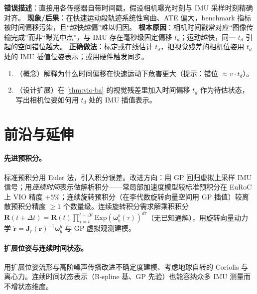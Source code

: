 \begin{pitfall}
\textbf{错误描述}：直接用各传感器自带时间戳，假设相机曝光时刻与 IMU 采样时刻精确对齐。
\textbf{现象/后果}：在快速运动段轨迹系统性弯曲、ATE 偏大，benchmark 指标被时间偏移污染，且“越快越偏”难以归因。
\textbf{根本原因}：相机时间戳常对应“图像传输完成”而非“曝光中点”，与 IMU 存在毫秒级固定偏移 $t_d$；运动越快，同一 $t_d$ 引起的空间错位越大。
\textbf{正确做法}：标定或在线估计 $t_d$，把视觉残差的相机位姿用 $t_d$ 处的 IMU 插值位姿表示；或用硬件触发同步。
\end{pitfall}

\begin{practice}
\begin{enumerate}
  \item （概念）解释为什么时间偏移在快速运动下危害更大（提示：错位 $\approx v\cdot t_d$）。
  \item （设计扩展）在 \cref{thm:vio-ba} 的视觉残差里加入时间偏移 $t_d$ 作为待估状态，写出相机位姿如何用 $t_d$ 处的 IMU 插值表示。
\end{enumerate}
\end{practice}

\section{前沿与延伸}
\label{sec:vio-frontier}

\paragraph{先进预积分。}
标准预积分用 Euler 法，引入积分误差。改进方向：用 GP 回归虚拟上采样 IMU 信号；用\emph{连续时间}表示做解析积分——常局部加速度模型较标准预积分在 EuRoC 上 VIO 精度 $+5\%$；连续旋转预积分（在李代数旋转向量空间用 GP 插值）较离散预积分精度 $\ge1$ 个数量级\cite{carlone2026handbook}。连续旋转积分需求解乘积积分 $\mathbf{R}(t+\Delta t)=\mathbf{R}(t)\prod_{\tau=t}^{t+\Delta t}\mathrm{Exp}(\boldsymbol{\omega}^b_b(\tau))^{d\tau}$（无已知通解），用旋转向量动力学 $\dot{\mathbf{r}}=\mathbf{J}_r(\mathbf{r})^{-1}\boldsymbol{\omega}^b_b$ 与 GP 虚拟观测建模。

\paragraph{扩展位姿与连续时间状态。}
用扩展位姿流形与高阶噪声传播改进不确定度建模、考虑地球自转的 Coriolis 与离心力\cite{carlone2026handbook}。连续时间状态表示（B-spline 基、GP 先验）也能容纳众多 IMU 测量而不增状态维度。

